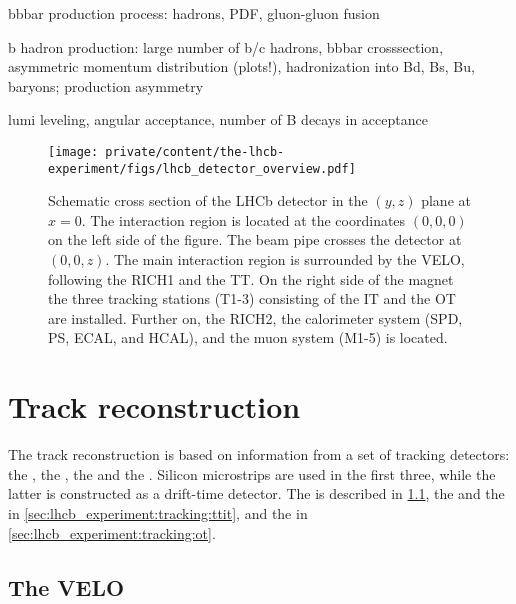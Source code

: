 bbbar production process:
hadrons, PDF, gluon-gluon fusion

b hadron production: large number of b/c hadrons, bbbar crosssection, asymmetric
momentum distribution (plots!), hadronization into Bd, Bs, Bu, baryons;
production asymmetry

lumi leveling, angular acceptance, number of B decays in acceptance

\begin{figure}[t]
  \texttt{[image: private/content/the-lhcb-experiment/figs/lhcb\_detector\_overview.pdf]}
  \caption{
    Schematic cross section of the \acs{LHCb} detector in the $(y,z)$ plane at
  $x=0$. The \protonproton interaction region is located at the coordinates
  $(0,0,0)$ on the left side of the figure. The beam pipe crosses the detector at
  $(0,0,z)$. The main interaction region is surrounded by the \acs*{VELO},
  following the \acs*{RICH}1 and the \acs*{TT}. On the right side of the magnet
  the three tracking stations (T1-3) consisting of the \acs*{IT} and the
  \acs*{OT} are installed. Further on, the \acs*{RICH}2, the calorimeter system
  (\acs*{SPD}, \acs*{PS}, \acs*{ECAL}, and \acs*{HCAL}), and the muon system
  (M1-5) is located. }
  \label{fig:lhcb_experiment:detector:overview}
\end{figure}

\section{Track reconstruction}
\label{sec:lhcb_experiment:tracking}

The \LHCb track reconstruction is based on information from a set of tracking
detectors: the \VELO, the \TT, the \IT and the \OT. Silicon microstrips are used
in the first three, while the latter is constructed as a drift-time detector.
The \VELO is described in \cref{sec:lhcb_experiment:tracking:velo}, the \TT and
the \IT in \cref{sec:lhcb_experiment:tracking:ttit}, and the \OT in
\cref{sec:lhcb_experiment:tracking:ot}.

\subsection{The \acl*{VELO}}
\label{sec:lhcb_experiment:tracking:velo}

